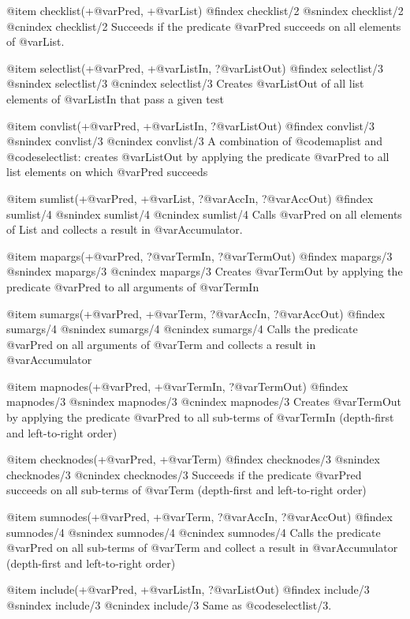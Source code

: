 {{{{{{{{{@item checklist(+@var{Pred}, +@var{List})
@findex checklist/2
@snindex checklist/2
@cnindex checklist/2
      Succeeds if the predicate @var{Pred} succeeds on all elements of @var{List}.

@item selectlist(+@var{Pred}, +@var{ListIn}, ?@var{ListOut})
@findex selectlist/3
@snindex selectlist/3
@cnindex selectlist/3
      Creates @var{ListOut} of all list elements of @var{ListIn} that pass a given test

@item convlist(+@var{Pred}, +@var{ListIn}, ?@var{ListOut})
@findex convlist/3
@snindex convlist/3
@cnindex convlist/3
      A combination of @code{maplist} and @code{selectlist}: creates @var{ListOut} by
applying the predicate @var{Pred} to all list elements on which
@var{Pred} succeeds

@item sumlist(+@var{Pred}, +@var{List}, ?@var{AccIn}, ?@var{AccOut})
@findex sumlist/4
@snindex sumlist/4
@cnindex sumlist/4
      Calls @var{Pred} on all elements of List and collects a result in
@var{Accumulator}.

@item mapargs(+@var{Pred}, ?@var{TermIn}, ?@var{TermOut})
@findex mapargs/3
@snindex mapargs/3
@cnindex mapargs/3
      Creates @var{TermOut} by applying the predicate @var{Pred} to all
      arguments of @var{TermIn}

@item sumargs(+@var{Pred}, +@var{Term}, ?@var{AccIn}, ?@var{AccOut})
@findex sumargs/4
@snindex sumargs/4
@cnindex sumargs/4
  Calls the predicate @var{Pred} on all arguments of @var{Term} and
collects a  result in @var{Accumulator}

@item mapnodes(+@var{Pred}, +@var{TermIn}, ?@var{TermOut}) 
@findex mapnodes/3
@snindex mapnodes/3
@cnindex mapnodes/3
      Creates @var{TermOut} by applying the predicate @var{Pred}
      to all sub-terms of @var{TermIn} (depth-first and left-to-right order)

@item checknodes(+@var{Pred}, +@var{Term}) 
@findex checknodes/3
@snindex checknodes/3
@cnindex checknodes/3
      Succeeds if the predicate @var{Pred} succeeds on all sub-terms of
      @var{Term} (depth-first and left-to-right order)

@item sumnodes(+@var{Pred}, +@var{Term}, ?@var{AccIn}, ?@var{AccOut})
@findex sumnodes/4
@snindex sumnodes/4
@cnindex sumnodes/4
      Calls the predicate @var{Pred} on all sub-terms of @var{Term} and
collect a result in @var{Accumulator} (depth-first and left-to-right
order)

@item include(+@var{Pred}, +@var{ListIn}, ?@var{ListOut})
@findex include/3
@snindex include/3
@cnindex include/3
      Same as @code{selectlist/3}.

}}}}}}}}}
